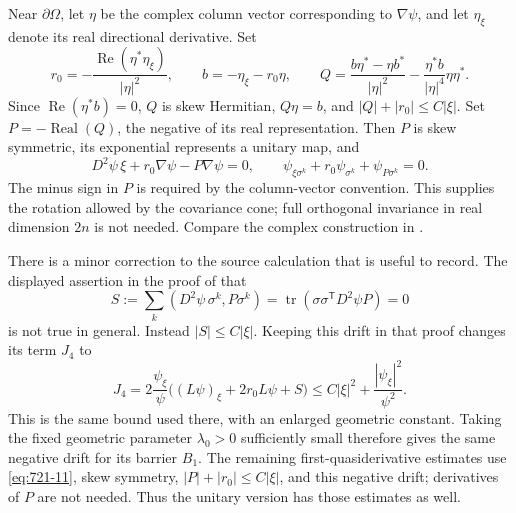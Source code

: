 \documentclass[11pt,a4paper]{article}
\theoremstyle{remark}
\begin{document}
Near $\partial\Omega$, let $\eta$ be the complex column vector corresponding
to $\nabla\psi$, and let $\eta_\xi$ denote its real directional derivative.
Set
\begin{equation}
 r_0=-\frac{\operatorname{Re}(\eta^*\eta_\xi)}{|\eta|^2},
 \qquad b=-\eta_\xi-r_0\eta,
 \qquad
 Q=\frac{b\eta^*-\eta b^*}{|\eta|^2}
     -\frac{\eta^*b}{|\eta|^4}\eta\eta^*.
 \label{eq:721-10}
\end{equation}
Since $\operatorname{Re}(\eta^*b)=0$, $Q$ is skew Hermitian,
$Q\eta=b$, and $|Q|+|r_0|\le C|\xi|$.  Set
$P=-\operatorname{Real}(Q)$, the negative of its real representation.  Then
$P$ is skew symmetric, its exponential represents a unitary map, and
\begin{equation}
 D^2\psi\,\xi+r_0\nabla\psi-P\nabla\psi=0,
 \qquad
 \psi_{\xi\sigma^k}+r_0\psi_{\sigma^k}+\psi_{P\sigma^k}=0.
 \label{eq:721-11}
\end{equation}
The minus sign in $P$ is required by the column-vector convention.
This supplies the rotation allowed by the covariance cone; full orthogonal
invariance in real dimension $2n$ is not needed.  Compare the complex
construction in \cite[\S3.2, equations (3.14)--(3.15)]{ZhouHessian2013}.

There is a minor correction to the source calculation that is useful to
record.  The displayed assertion in the proof of
\cite[Lemma 7.1]{ZhouBellman2015} that
\[
 S:=\sum_k(D^2\psi\,\sigma^k,P\sigma^k)
   =\operatorname{tr}(\sigma\sigma^{\mathsf T}D^2\psi P)=0
\]
is not true in general.  Instead $|S|\le C|\xi|$.
Keeping this drift in that proof changes its term $J_4$ to
\begin{equation}
 J_4=2\frac{\psi_\xi}{\psi}
       \bigl((L\psi)_\xi+2r_0L\psi+S\bigr)
 \le C|\xi|^2+\frac{|\psi_\xi|^2}{\psi^2}.
 \label{eq:721-12}
\end{equation}
This is the same bound used there, with an enlarged geometric constant.
Taking the fixed geometric parameter $\lambda_0>0$ sufficiently small
therefore gives the same negative drift for its barrier $B_1$.
The remaining first-quasiderivative estimates use \eqref{eq:721-11}, skew symmetry,
$|P|+|r_0|\le C|\xi|$, and this negative drift; derivatives of $P$ are not
needed.  Thus the unitary version has those estimates as well.
\end{document}
